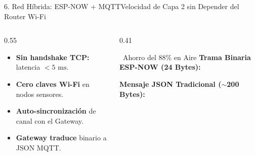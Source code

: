 \documentclass[aspectratio=169,11pt,xcolor=table]{beamer}
\begin{document}
\begin{frame}{6. Red Híbrida: ESP-NOW + MQTT}{Velocidad de Capa 2 sin Depender del Router Wi-Fi}
  \vspace{0.15cm}
  \begin{columns}[c,onlytextwidth]
    \begin{column}{0.55\textwidth}
      \normalsize
      \begin{itemize}\setlength{\itemsep}{10pt}
        \item \textbf{Sin handshake TCP:} latencia $< 5\text{ ms}$.
        \item \textbf{Cero claves Wi-Fi} en nodos sensores.
        \item \textbf{Auto-sincronización} de canal con el Gateway.
        \item \textbf{Gateway traduce} binario a JSON MQTT.
      \end{itemize}
    \end{column}
    \begin{column}{0.41\textwidth}
      \begin{softcard}[brandgreen]{\faCompress\ Ahorro del 88\% en Aire}
        \vspace{2pt}
        {\scriptsize\textbf{\color{brandgreen}Trama Binaria ESP-NOW (24 Bytes):}}\\[2pt]
        \vspace{4pt}

        {\scriptsize\textbf{\color{inkmuted}Mensaje JSON Tradicional ($\sim$200 Bytes):}}\\[2pt]
      \end{softcard}
    \end{column}
  \end{columns}
\end{frame}
\end{document}
